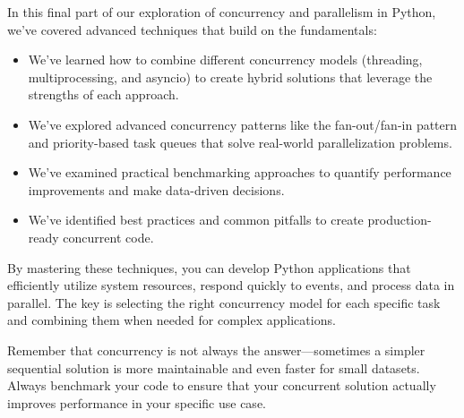 \documentclass[12pt,letterpaper]{article}
\begin{document}
In this final part of our exploration of concurrency and parallelism in Python, we've covered advanced techniques that build on the fundamentals:

\begin{itemize}
    \item We've learned how to combine different concurrency models (threading, multiprocessing, and asyncio) to create hybrid solutions that leverage the strengths of each approach.
    
    \item We've explored advanced concurrency patterns like the fan-out/fan-in pattern and priority-based task queues that solve real-world parallelization problems.
    
    \item We've examined practical benchmarking approaches to quantify performance improvements and make data-driven decisions.
    
    \item We've identified best practices and common pitfalls to create production-ready concurrent code.
\end{itemize}

By mastering these techniques, you can develop Python applications that efficiently utilize system resources, respond quickly to events, and process data in parallel. The key is selecting the right concurrency model for each specific task and combining them when needed for complex applications.

Remember that concurrency is not always the answer—sometimes a simpler sequential solution is more maintainable and even faster for small datasets. Always benchmark your code to ensure that your concurrent solution actually improves performance in your specific use case.
\end{document}
